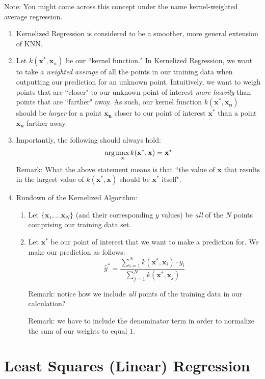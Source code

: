 \documentclass[11pt,letterpaper]{article}
\begin{document}
Note: You might come across this concept under the name kernel-weighted average regression.
\begin{enumerate}
    \item Kernelized Regression is considered to be a smoother, more general extension of KNN.
    \item Let $k(\mathbf{x^*}, \mathbf{x}_n)$ be our ``kernel function." In Kernelized Regression, we want to take a \emph{weighted average} of all the points in our training data when outputting our prediction for an unknown point. Intuitively, we want to weigh points that are ``closer" to our unknown point of interest \emph{more heavily} than points that are ``farther" away. As such, our kernel function $k(\mathbf{x^*}, \mathbf{x_n})$ should be \emph{larger} for a point $\mathbf{x_n}$ closer to our point of interest $\mathbf{x^{*}}$ than a point $\mathbf{x_n}$ farther away.
    \item Importantly, the following should always hold:
    $$\textnormal{arg}\max_{\mathbf{x}} k(\mathbf{x^*}, \mathbf{x}) = \mathbf{x^{*}}$$
    Remark: What the above statement means is that ``the value of $\mathbf{x}$ that results in the largest value of $k(\mathbf{x^*}, \mathbf{x})$ should be $\mathbf{x^{*}}$ itself".
    \item Rundown of the Kernelized Algorithm:
    \begin{enumerate}
        \item Let $\{\mathbf{x}_1, \dots \mathbf{x}_N\}$ (and their corresponding $y$ values) be \emph{all} of the $N$ points comprising our training data set. \item Let $\mathbf{x^{*}}$ be our point of interest that we want to make a prediction for. We make our prediction as follows:
        $$\hat{y}^* = \frac{\displaystyle\sum_{i=1}^{N}k(\mathbf{x^{*}}, \mathbf{x}_i) \cdot y_{i}}{\displaystyle\sum_{j=1}^{N}k(\mathbf{x^{*}}, \mathbf{x}_j)}$$
        
        Remark: notice how we include \emph{all} points of the training data in our calculation?
        
        Remark: we have to include the denominator term in order to normalize the sum of our weights to equal $1$.
    \end{enumerate}
\end{enumerate}

\section{Least Squares (Linear) Regression}
\end{document}
